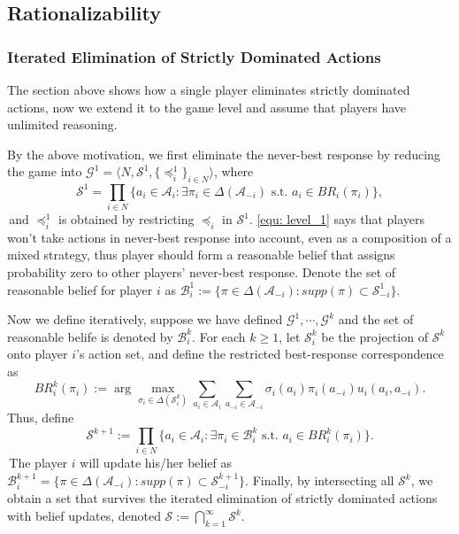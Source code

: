 \subsection{Rationalizability}
\subsubsection{Iterated Elimination of Strictly Dominated Actions}
The section above shows how a single player eliminates strictly dominated actions, now we extend it to the game level and assume that players have unlimited reasoning.

By the above motivation, we first eliminate the never-best response by reducing the game into $\mathcal{G}^1=\langle N, \mathcal{S}^1, \{\preceq^1_i\}_{i\in N}\rangle $, where 
\begin{equation} \label{equ: level_1}
    \mathcal{S}^1=\prod_{i\in N}\{a_i\in \mathcal{A}_i: \exists \pi_i \in \Delta(\mathcal{A}_{-i}) \text{ s.t. } a_i\in BR_i(\pi_i)\},
\end{equation}
\,and $\preceq^1_i$ is obtained by restricting $\preceq_i$ in $\mathcal{S}^1$. \eqref{equ: level_1} says that players won't take actions in never-best response into account, even as a composition of a mixed strategy, thus player should form a reasonable belief that assigns probability zero to other players' never-best response. Denote the set of reasonable belief for player $i$ as $\mathcal{B}_i^1:=\{\pi \in \Delta(\mathcal{A}_{-i}):supp(\pi) \subset \mathcal{S}^1_{-i}\}$.

Now we define iteratively, suppose we have defined $\mathcal{G}^1, \cdots, \mathcal{G}^k$ and the set of reasonable belife is denoted by $\mathcal{B}_i^k$. For each $k\ge 1$, let $\mathcal{S}^k_i$ be the projection of $\mathcal{S}^k$ onto player $i$'s action set, and define the restricted best-response correspondence as
\[
BR_i^k(\pi_i) := \arg\max_{\sigma_i \in \Delta(\mathcal{S}^k_i)} \sum_{a_i\in\mathcal{A}_i}\sum_{a_{-i}\in\mathcal{A}_{-i}} \sigma_i(a_i)\pi_i(a_{-i})u_i(a_i,a_{-i}).
\]
Thus, define 
$$
\mathcal{S}^{k+1} :=\prod_{i\in N} \{a_i\in \mathcal{A}_i: \exists \pi_i \in \mathcal{B}_i^k \text{ s.t. } a_i\in BR_i^k(\pi_i)\}.
$$          
\,The player $i$ will update his/her belief as $\mathcal{B}_i^{k+1}=\{\pi \in \Delta(\mathcal{A}_{-i}):supp(\pi) \subset \mathcal{S}^{k+1}_{-i}\}.$ Finally, by intersecting all $\mathcal{S}^k$, we obtain a set that survives the iterated elimination of strictly dominated actions with belief updates, denoted $\mathcal{S}:= \bigcap_{k=1}^{\infty}\mathcal{S}^k$.

